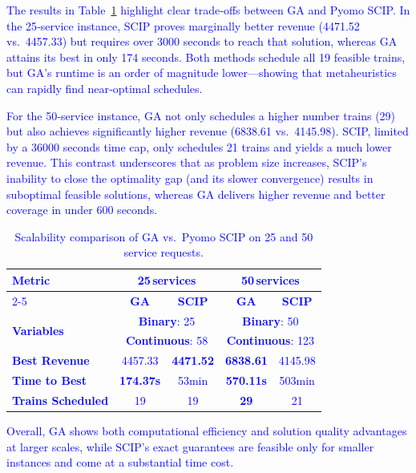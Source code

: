 \documentclass[Afour,sagev,times]{sagej}
\newcommand{\primero}[1]{\textcolor{blue}{#1}}
\begin{document}
\primero{
The results in Table~\ref{tab:scalability} highlight clear trade‐offs between GA and Pyomo SCIP. In the 25‐service instance, SCIP proves marginally better revenue (4471.52 vs.\ 4457.33) but requires over 3000 seconds to reach that solution, whereas GA attains its best in only 174 seconds. Both methods schedule all 19 feasible trains, but GA's runtime is an order of magnitude lower—showing that metaheuristics can rapidly find near‐optimal schedules.  
}

\primero{
For the 50‐service instance, GA not only schedules a higher number trains (29) but also achieves significantly higher revenue (6838.61 vs.\ 4145.98). SCIP, limited by a 36000 seconds time cap, only schedules 21 trains and yields a much lower revenue. This contrast underscores that as problem size increases, SCIP's inability to close the optimality gap (and its slower convergence) results in suboptimal feasible solutions, whereas GA delivers higher revenue and better coverage in under 600 seconds.
}

\begin{table}[htbp]
\centering
\scriptsize
\caption{Scalability comparison of GA vs.\ Pyomo SCIP on 25 and 50 service requests.}
\primero{
\begin{tabular}{|l|cc|cc|}
\hline
\multirow{2}{*}{\textbf{Metric}} & \multicolumn{2}{c|}{\textbf{25\,services}} & \multicolumn{2}{c|}{\textbf{50\,services}} \\ \cline{2-5}
& \textbf{GA}       & \textbf{SCIP}       & \textbf{GA}       & \textbf{SCIP}        \\ \hline
\multirow{2}{*}{\textbf{Variables}} & \multicolumn{2}{c|}{\textbf{Binary}: 25} & \multicolumn{2}{c|}{\textbf{Binary}: 50} \\ 
& \multicolumn{2}{c|}{\textbf{Continuous}: 58} & \multicolumn{2}{c|}{\textbf{Continuous}: 123} \\ \hline
\textbf{Best Revenue} & 4457.33 & \textbf{4471.52} & \textbf{6838.61} & 4145.98 \\ \hline
\textbf{Time to Best}  & \textbf{174.37s} & 53min & \textbf{570.11s} & 503min  \\ \hline
\textbf{Trains Scheduled} & 19 & 19 & \textbf{29} & 21 \\ \hline
\end{tabular}
}
\label{tab:scalability}
\end{table}

\primero{
Overall, GA shows both computational efficiency and solution quality advantages at larger scales, while SCIP’s exact guarantees are feasible only for smaller instances and come at a substantial time cost.
}
\end{document}
